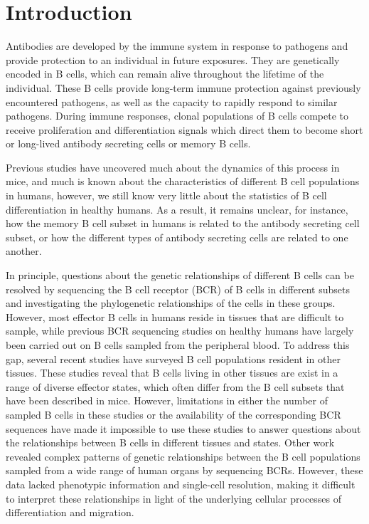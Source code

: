\section{Introduction}
 Antibodies are developed by the immune system in response to pathogens and  provide protection to an individual in future exposures.  They are genetically encoded in B cells, which can remain alive throughout the lifetime of the individual\cite{slifka1998humoral}. These B cells provide long-term immune protection against previously encountered pathogens, as well as the capacity to rapidly respond to similar pathogens. During immune responses, clonal populations of B cells compete to receive proliferation and differentiation signals which direct them to become short or long-lived antibody secreting cells or memory B cells. 

Previous studies have uncovered much about the dynamics of this process in mice\cite{victora2022germinal},  and much is known about the characteristics of different B cell populations in humans\cite{halliley2015long, glass2020integrated, tarlinton2023making}, however, we still know very little about the statistics of B cell differentiation in healthy humans. As a result, it remains unclear, for instance, how the memory B cell subset in humans is related to the antibody secreting cell subset, or how the different types of antibody secreting cells are related to one another\cite{tarlinton2023making}. 

In principle, questions about the genetic relationships of different B cells can be resolved by sequencing the B cell receptor (BCR) of B cells in different subsets and investigating the phylogenetic relationships of the cells in these groups\cite{ellebedy2016defining,briney2019commonality,phad_lanza_2022clonal, horns2016lineage}. However, most effector B cells in humans reside in tissues that are difficult to sample, while previous BCR sequencing studies on healthy humans have largely been carried out on B cells sampled from the peripheral blood. To address this gap, several recent studies have surveyed B cell populations resident in other tissues\cite{glass2020integrated, tabula2022tabula, dominguez2022cross}.  These studies reveal that B cells living in other tissues are exist in a range of diverse effector states, which often differ from the B cell subsets that have been described in mice\cite{glass2020integrated, dominguez2022cross}. However, limitations in either the number of sampled B cells in these studies or the availability of the corresponding BCR sequences have made it impossible to use these studies to answer questions about the relationships between B cells in different tissues and states. Other work\cite{meng2017atlas, yang2021shared} revealed complex patterns of genetic relationships between the B cell populations sampled from a wide range of human organs by sequencing BCRs. However, these data lacked phenotypic information and single-cell resolution, making it difficult to interpret these relationships in light of the underlying cellular processes of differentiation and migration. 


